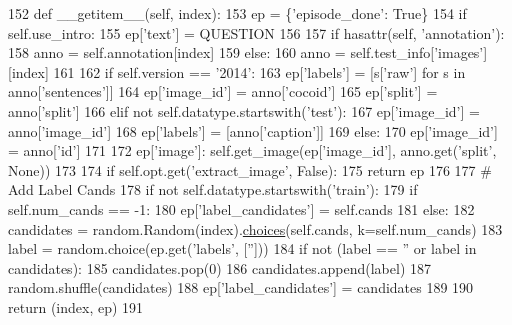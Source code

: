 \begin{DoxyCode}
152     \textcolor{keyword}{def }\_\_getitem\_\_(self, index):
153         ep = \{\textcolor{stringliteral}{'episode\_done'}: \textcolor{keyword}{True}\}
154         \textcolor{keywordflow}{if} self.use\_intro:
155             ep[\textcolor{stringliteral}{'text'}] = QUESTION
156 
157         \textcolor{keywordflow}{if} hasattr(self, \textcolor{stringliteral}{'annotation'}):
158             anno = self.annotation[index]
159         \textcolor{keywordflow}{else}:
160             anno = self.test\_info[\textcolor{stringliteral}{'images'}][index]
161 
162         \textcolor{keywordflow}{if} self.version == \textcolor{stringliteral}{'2014'}:
163             ep[\textcolor{stringliteral}{'labels'}] = [s[\textcolor{stringliteral}{'raw'}] \textcolor{keywordflow}{for} s \textcolor{keywordflow}{in} anno[\textcolor{stringliteral}{'sentences'}]]
164             ep[\textcolor{stringliteral}{'image\_id'}] = anno[\textcolor{stringliteral}{'cocoid'}]
165             ep[\textcolor{stringliteral}{'split'}] = anno[\textcolor{stringliteral}{'split'}]
166         \textcolor{keywordflow}{elif} \textcolor{keywordflow}{not} self.datatype.startswith(\textcolor{stringliteral}{'test'}):
167             ep[\textcolor{stringliteral}{'image\_id'}] = anno[\textcolor{stringliteral}{'image\_id'}]
168             ep[\textcolor{stringliteral}{'labels'}] = [anno[\textcolor{stringliteral}{'caption'}]]
169         \textcolor{keywordflow}{else}:
170             ep[\textcolor{stringliteral}{'image\_id'}] = anno[\textcolor{stringliteral}{'id'}]
171 
172         ep[\textcolor{stringliteral}{'image'}]: self.get\_image(ep[\textcolor{stringliteral}{'image\_id'}], anno.get(\textcolor{stringliteral}{'split'}, \textcolor{keywordtype}{None}))
173 
174         \textcolor{keywordflow}{if} self.opt.get(\textcolor{stringliteral}{'extract\_image'}, \textcolor{keyword}{False}):
175             \textcolor{keywordflow}{return} ep
176 
177         \textcolor{comment}{# Add Label Cands}
178         \textcolor{keywordflow}{if} \textcolor{keywordflow}{not} self.datatype.startswith(\textcolor{stringliteral}{'train'}):
179             \textcolor{keywordflow}{if} self.num\_cands == -1:
180                 ep[\textcolor{stringliteral}{'label\_candidates'}] = self.cands
181             \textcolor{keywordflow}{else}:
182                 candidates = random.Random(index).\hyperlink{namespaceparlai_1_1mturk_1_1tasks_1_1personachat_1_1personachat__chat_1_1extract__and__save__personas_a71338ed717c1e7ba7c54bfff02589e4e}{choices}(self.cands, k=self.num\_cands)
183                 label = random.choice(ep.get(\textcolor{stringliteral}{'labels'}, [\textcolor{stringliteral}{''}]))
184                 \textcolor{keywordflow}{if} \textcolor{keywordflow}{not} (label == \textcolor{stringliteral}{''} \textcolor{keywordflow}{or} label \textcolor{keywordflow}{in} candidates):
185                     candidates.pop(0)
186                     candidates.append(label)
187                     random.shuffle(candidates)
188                 ep[\textcolor{stringliteral}{'label\_candidates'}] = candidates
189 
190         \textcolor{keywordflow}{return} (index, ep)
191 
\end{DoxyCode}
